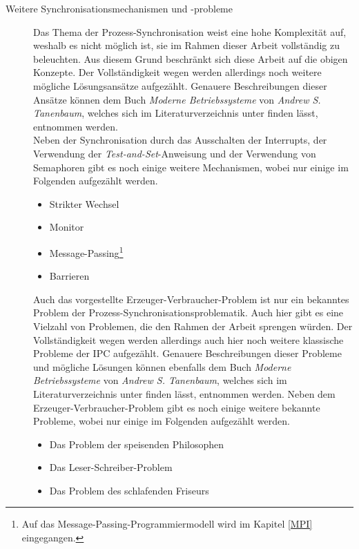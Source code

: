 \begin{description}
					\item[Weitere Synchronisationsmechanismen und -probleme]
					
						Das Thema der Prozess-Synchronisation weist eine hohe Komplexität auf, weshalb es nicht möglich ist, sie im Rahmen dieser Arbeit vollständig zu beleuchten. Aus diesem Grund beschränkt sich diese Arbeit auf die obigen Konzepte. Der Vollständigkeit wegen werden allerdings noch weitere mögliche Lösungsansätze aufgezählt. Genauere Beschreibungen dieser Ansätze können dem Buch \textit{Moderne Betriebssysteme} von \textit{Andrew S. Tanenbaum}, welches sich im Literaturverzeichnis unter \cite{ModerneBetriebssysteme} finden lässt, entnommen werden.\\
						Neben der Synchronisation durch das Ausschalten der Interrupts, der Verwendung der \textit{Test-and-Set}-Anweisung und der Verwendung von Semaphoren gibt es noch einige weitere Mechanismen, wobei nur einige im Folgenden aufgezählt werden. \cite{ModerneBetriebssysteme}
						
						\begin{itemize}
							\item Strikter Wechsel
							\item Monitor
							\item Message-Passing\footnote{Auf das Message-Passing-Programmiermodell wird im Kapitel \ref{MPI} eingegangen.}
							\item Barrieren \cite{ModerneBetriebssysteme}
						\end{itemize}
					
						Auch das vorgestellte Erzeuger-Verbraucher-Problem ist nur ein bekanntes Problem der Prozess-Synchronisationsproblematik. Auch hier gibt es eine Vielzahl von Problemen, die den Rahmen der Arbeit sprengen würden. Der Vollständigkeit wegen werden allerdings auch hier noch weitere klassische Probleme der IPC aufgezählt. Genauere Beschreibungen dieser Probleme und mögliche Lösungen können ebenfalls dem Buch \textit{Moderne Betriebssysteme} von \textit{Andrew S. Tanenbaum}, welches sich im Literaturverzeichnis unter \cite{ModerneBetriebssysteme} finden lässt, entnommen werden.
						Neben dem Erzeuger-Verbraucher-Problem gibt es noch einige weitere bekannte Probleme, wobei nur einige im Folgenden aufgezählt werden. \cite{ModerneBetriebssysteme}
						
						\begin{itemize}
							\item Das Problem der speisenden Philosophen
							\item Das Leser-Schreiber-Problem
							\item Das Problem des schlafenden Friseurs \cite{ModerneBetriebssysteme}
						\end{itemize}
				\end{description}
			
